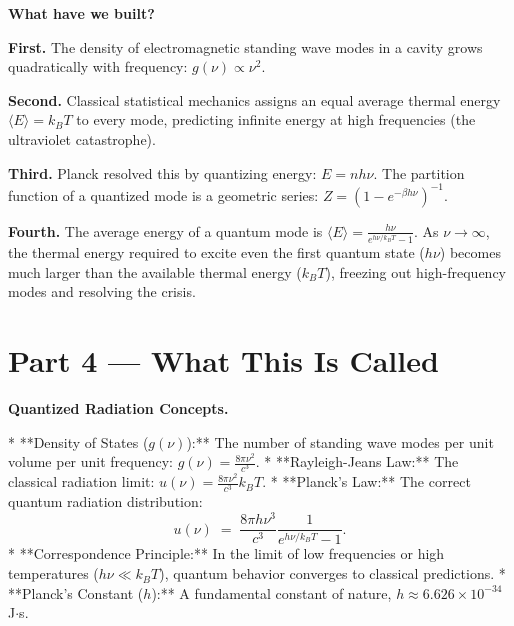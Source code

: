 \documentclass[12pt, a4paper, twoside]{book}
\begin{document}
\begin{discoverybox}
\textbf{What have we built?}

\textbf{First.} The density of electromagnetic standing wave modes in a cavity grows quadratically with frequency: $g(\nu) \propto \nu^2$.

\textbf{Second.} Classical statistical mechanics assigns an equal average thermal energy $\langle E \rangle = k_B T$ to every mode, predicting infinite energy at high frequencies (the ultraviolet catastrophe).

\textbf{Third.} Planck resolved this by quantizing energy: $E = n h\nu$. The partition function of a quantized mode is a geometric series: $Z = (1 - e^{-\beta h\nu})^{-1}$.

\textbf{Fourth.} The average energy of a quantum mode is $\langle E \rangle = \frac{h\nu}{e^{h\nu/k_B T} - 1}$. As $\nu \to \infty$, the thermal energy required to excite even the first quantum state ($h\nu$) becomes much larger than the available thermal energy ($k_B T$), freezing out high-frequency modes and resolving the crisis.
\end{discoverybox}

\newpage

\section{Part 4 --- What This Is Called}

\begin{namebox}
\textbf{Quantized Radiation Concepts.}

* **Density of States ($g(\nu)$):** The number of standing wave modes per unit volume per unit frequency: $g(\nu) = \frac{8\pi \nu^2}{c^3}$.
* **Rayleigh-Jeans Law:** The classical radiation limit: $u(\nu) = \frac{8\pi \nu^2}{c^3} k_B T$.
* **Planck's Law:** The correct quantum radiation distribution:
  \[
    u(\nu) \;=\; \frac{8\pi h \nu^3}{c^3} \frac{1}{e^{h\nu/k_B T} - 1}.
  \]
* **Correspondence Principle:** In the limit of low frequencies or high temperatures ($h\nu \ll k_B T$), quantum behavior converges to classical predictions.
* **Planck's Constant ($h$):** A fundamental constant of nature, $h \approx 6.626 \times 10^{-34}$ J$\cdot$s.
\end{namebox}

\newpage

\end{document}
